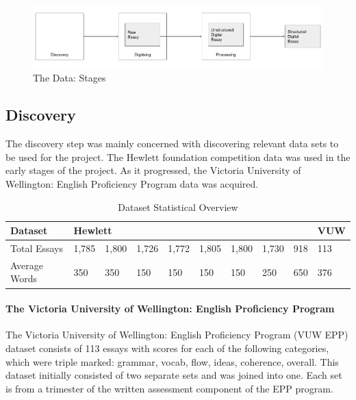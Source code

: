 \begin{figure}[h]
     \centering
     \includegraphics[width=.75\linewidth]{pngs/data-stages.png}
     \caption{The Data: Stages}\label{Fig:Data1}
\end{figure}

\subsection{Discovery}
The discovery step was mainly concerned with discovering relevant data sets to be used for the project. The Hewlett foundation competition data was used in the early stages of the project. As it progressed, the Victoria University of Wellington: English Proficiency Program data was acquired.

\begin{table}[h]
\centering
\begin{tabular}{@{}|l|llllllll|l|@{}}
\toprule
Dataset &
  \multicolumn{8}{l|}{Hewlett} &
  VUW \\ \midrule
Total Essays &
  \multicolumn{1}{l|}{1,785} &
  \multicolumn{1}{l|}{1,800} &
  \multicolumn{1}{l|}{1,726} &
  \multicolumn{1}{l|}{1,772} &
  \multicolumn{1}{l|}{1,805} &
  \multicolumn{1}{l|}{1,800} &
  \multicolumn{1}{l|}{1,730} &
  918 &
  113 \\ \midrule
Average Words &
  \multicolumn{1}{l|}{350} &
  \multicolumn{1}{l|}{350} &
  \multicolumn{1}{l|}{150} &
  \multicolumn{1}{l|}{150} &
  \multicolumn{1}{l|}{150} &
  \multicolumn{1}{l|}{150} &
  \multicolumn{1}{l|}{250} &
  650 &
  376 \\ \bottomrule
\end{tabular}
\caption{Dataset Statistical Overview}
\label{tab:1}
\end{table}

\paragraph{The Victoria University of Wellington: English Proficiency Program}
The Victoria University of Wellington: English Proficiency Program (VUW EPP) dataset consists of 113 essays with scores for each of the following categories, which were triple marked: grammar, vocab, flow, ideas, coherence, overall. This dataset initially consisted of two separate sets and was joined into one. Each set is from a trimester of the written assessment component of the EPP program.

